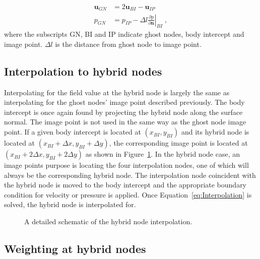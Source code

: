 \begin{align}
\textbf{u}_{GN} &= 2\textbf{u}_{BI} - \textbf{u}_{IP} \label{eq:Velocity Interpolation} \\
p_{GN} &= p_{IP} - \Delta l \left. \frac{\partial p}{\partial \textbf{n}}\right|_{BI} \;, \label{eq:Pressure Interpolation}
\end{align}
where the subscripts GN, BI and IP indicate ghost nodes, body intercept and image point. $\Delta l$ is the distance from ghost node to image point.
\subsection{Interpolation to hybrid nodes}
\label{Sec:Interpolation}

Interpolating for the field value at the hybrid node is largely the same as interpolating for the ghost nodes' image point described previously. 
The body intercept is once again found by projecting the hybrid node along the surface normal. 
The image point is not used in the same way as the ghost node image point. 
If a given body intercept is located at $(x_{BI},y_{BI})$ and its hybrid node is located at $(x_{BI}+\Delta x,y_{BI}+\Delta y)$, the corresponding image point is located at $(x_{BI}+2\Delta x,y_{BI}+2\Delta y)$ as shown in Figure~\ref{fig:Interpolate}. 
In the hybrid node case, an image points purpose is locating the four interpolation nodes, one of which will always be the corresponding hybrid node. 
The interpolation node coincident with the hybrid node is moved to the body intercept and the appropriate boundary condition for velocity or pressure is applied.
Once Equation~\eqref{eq:Interpolation} is solved, the hybrid node is interpolated for.

\begin{figure}[!htb]
	\centering
	
	\caption{A detailed schematic of the hybrid node interpolation.}
	\label{fig:Interpolate}
\end{figure}

\subsection{Weighting at hybrid nodes}
\label{Sec:Weighting}

